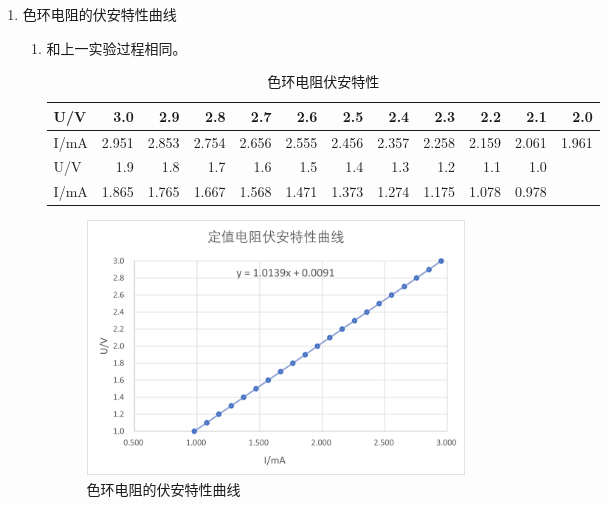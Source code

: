 \documentclass[11pt]{article}
\begin{document}
\begin{enumerate}
\begin{enumerate}
    \end{enumerate}
    \item 色环电阻的伏安特性曲线
    \begin{enumerate}
        \item 和上一实验过程相同。
        \begin{table}[H]
          \centering
          \caption{色环电阻伏安特性}
          \vspace*{1em}
            \begin{tabular}{|l|r|r|r|r|r|r|r|r|r|r|r|}\hline
            U/V   & 3.0   & 2.9   & 2.8   & 2.7   & 2.6   & 2.5   & 2.4   & 2.3   & 2.2   & 2.1   & 2.0  \\\hline
            I/mA  & 2.951  & 2.853 & 2.754 & 2.656 & 2.555 & 2.456 & 2.357 & 2.258 & 2.159 & 2.061 & 1.961 \\\hline
            U/V   & 1.9   & 1.8   & 1.7   & 1.6   & 1.5   & 1.4   & 1.3   & 1.2   & 1.1   & 1.0   &  \\\hline
            I/mA  & 1.865 & 1.765 & 1.667 & 1.568 & 1.471 & 1.373 & 1.274 & 1.175 & 1.078 & 0.978 &  \\\hline
            \end{tabular}%
        \end{table}%
        \begin{figure}[H]
            \centering
            \includegraphics[width=10cm]{Fig/2.png}
            \caption{色环电阻的伏安特性曲线}
        \end{figure}
    \end{enumerate}


\end{enumerate}
\end{document}
